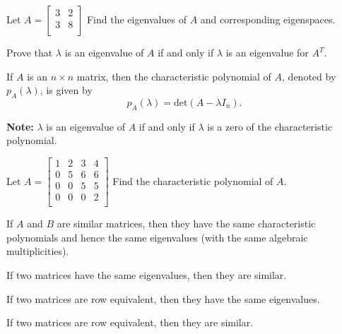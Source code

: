 \begin{enumerate}
\vfill

\Problem Let $A=\begin{bmatrix} 3 & 2\\ 3 & 8\\ \end{bmatrix}$ Find the eigenvalues of $A$ and corresponding eigenspaces.

\vfill

\newpage

\Problem Prove that $\lambda$ is an eigenvalue of $A$ if and only if $\lambda$ is an eigenvalue for $A^{T}$.

\vfill

\begin{defn} If $A$ is an $n\times n$ matrix, then the characteristic polynomial of $A$, denoted by $p_A(\lambda)$, is given by $$p_A(\lambda)=\text{det}(A-\lambda I_n).$$
\end{defn}

{\bf Note:} $\lambda$ is an eigenvalue of $A$ if and only if $\lambda$ is a zero of the characteristic polynomial.

\Problem Let $A=\begin{bmatrix} 1 & 2 & 3 & 4\\ 
0 & 5 & 6 & 6\\
0 & 0 & 5 & 5\\
0 & 0 & 0 & 2\\
\end{bmatrix}$ Find the characteristic polynomial of $A$.

\vfill 

\newpage

\Problem If $A$ and $B$ are similar matrices, then they have the same characteristic polynomials and hence the same eigenvalues (with the same algebraic multiplicities). 

\vfill


\Part If two matrices have the same eigenvalues, then they are similar.

\vfill

\Part If two matrices are row equivalent, then they have the same eigenvalues.

\vfill

\Part If two matrices are row equivalent, then they are similar.

\vfill

\end{enumerate}

